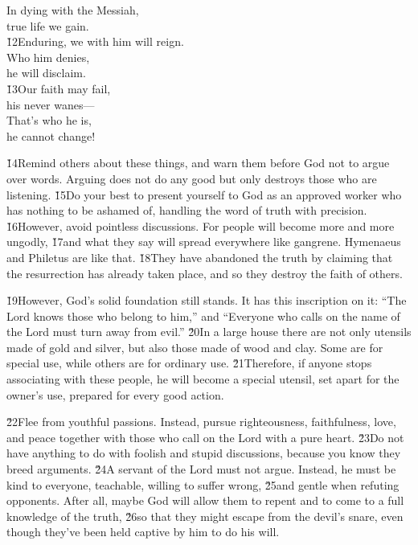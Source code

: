 \begin{poetry}
\poeml In dying with the Messiah, \\
\poemll    true life we gain. \\
\poeml \v{12}Enduring, we with him will reign. \\
\poemll    Who him denies, \\
\poemlll       he will disclaim. \\
\poeml \v{13}Our faith may fail, \\
\poemll    his never wanes--- \\
\poeml That's who he is, \\
\poemll    he cannot change!
\end{poetry}

\v{14}Remind others about these things, and warn them before God not to argue over words. Arguing does not do any good but only destroys those who are listening. \v{15}Do your best to present yourself to God as an approved worker who has nothing to be ashamed of, handling the word of truth with precision. \v{16}However, avoid pointless discussions. For people will become more and more ungodly, \v{17}and what they say will spread everywhere like gangrene. Hymenaeus and Philetus are like that. \v{18}They have abandoned the truth by claiming that the resurrection has already taken place, and so they destroy the faith of others.

\v{19}However, God's solid foundation still stands. It has this inscription on it: ``The Lord knows those who belong to him,'' and ``Everyone who calls on the name of the Lord must turn away from evil.'' \v{20}In a large house there are not only utensils made of gold and silver, but also those made of wood and clay. Some are for special use, while others are for ordinary use. \v{21}Therefore, if anyone stops associating with these people, he will become a special utensil, set apart for the owner's use, prepared for every good action.

\v{22}Flee from youthful passions. Instead, pursue righteousness, faithfulness, love, and peace together with those who call on the Lord with a pure heart. \v{23}Do not have anything to do with foolish and stupid discussions, because you know they breed arguments. \v{24}A servant of the Lord must not argue. Instead, he must be kind to everyone, teachable, willing to suffer wrong, \v{25}and gentle when refuting opponents. After all, maybe God will allow them to repent and to come to a full knowledge of the truth, \v{26}so that they might escape from the devil's snare, even though they've been held captive by him to do his will.


